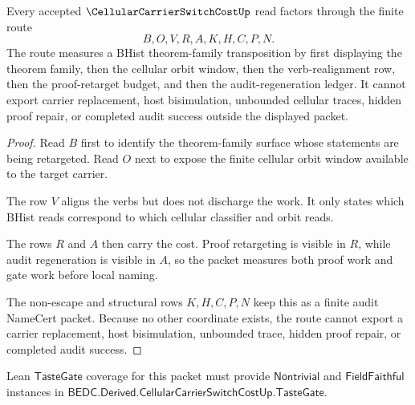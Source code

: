 \begin{theorem}
\label{thm:cellular-carrier-switch-cost-finite-audit-route}
Every accepted $\CellularCarrierSwitchCostUp$ read factors through the finite route
$$
B,O,V,R,A,K,H,C,P,N .
$$
The route measures a BHist theorem-family transposition by first displaying the theorem family, then the cellular orbit window, then the verb-realignment row, then the proof-retarget budget, and then the audit-regeneration ledger. It cannot export carrier replacement, host bisimulation, unbounded cellular traces, hidden proof repair, or completed audit success outside the displayed packet.
\end{theorem}
\begin{proof}
Read $B$ first to identify the theorem-family surface whose statements are being retargeted. Read $O$ next to expose the finite cellular orbit window available to the target carrier.

The row $V$ aligns the verbs but does not discharge the work. It only states which BHist reads correspond to which cellular classifier and orbit reads.

The rows $R$ and $A$ then carry the cost. Proof retargeting is visible in $R$, while audit regeneration is visible in $A$, so the packet measures both proof work and gate work before local naming.

The non-escape and structural rows $K,H,C,P,N$ keep this as a finite audit NameCert packet. Because no other coordinate exists, the route cannot export a carrier replacement, host bisimulation, unbounded trace, hidden proof repair, or completed audit success.
\end{proof}



Lean $\mathsf{TasteGate}$ coverage for this packet must provide $\mathsf{Nontrivial}$ and $\mathsf{FieldFaithful}$ instances in $\mathsf{BEDC.Derived.CellularCarrierSwitchCostUp.TasteGate}$.

